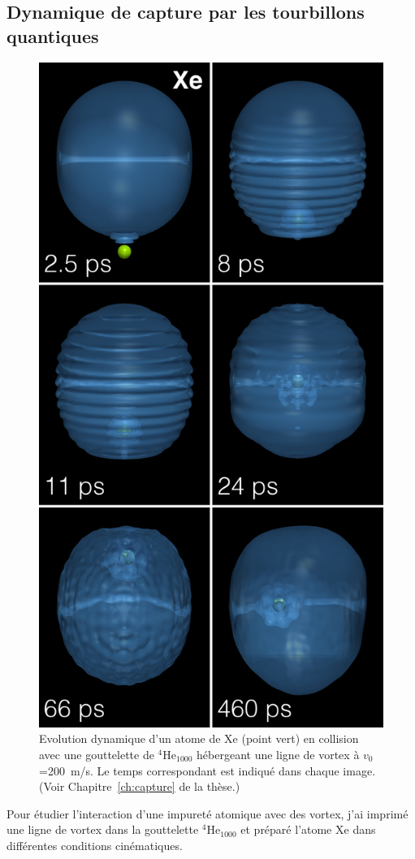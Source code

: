 	\subsection*{Dynamique de capture par les tourbillons quantiques}
		\begin{figure}
			\centering
			\includegraphics[width=0.75\linewidth]{fig10}
			\caption{\label{fig10-capture}
			Evolution dynamique d'un atome de Xe (point vert) en collision avec une gouttelette de $^4$He$_{1000}$ hébergeant une ligne de vortex à $v_0$=200~m/s. 
			Le temps correspondant est indiqué dans chaque image. (Voir Chapitre~\ref{ch:capture} de la thèse.)}
		\end{figure}	
		Pour étudier l'interaction d'une impureté atomique avec des vortex, j'ai imprimé une ligne de vortex dans la gouttelette $^4$He$_{1000}$ et préparé l'atome Xe dans différentes conditions cinématiques.

